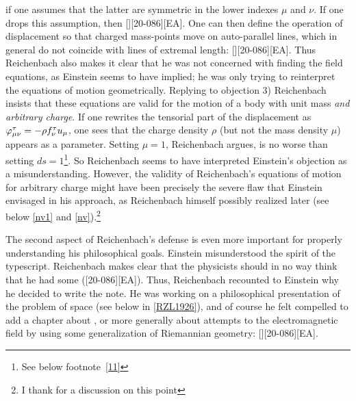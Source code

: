\documentclass[draft]{article}
\begin{document}
if one assumes that the latter are symmetric in the lower indexes $\mu$ and $\nu$. If one drops this assumption, then [][20-086][EA]. One can then define the operation of displacement so that charged mass-points move on auto-parallel lines, which in general do not coincide with lines of extremal length: [][20-086][EA]. Thus Reichenbach also makes it clear that he was not concerned with finding the field equations, as Einstein seems to have implied; he was only trying to reinterpret the equations of motion geometrically. Replying to objection 3) Reichenbach insists that these equations are valid for the motion of a body with unit mass \emph{and arbitrary charge}. If one rewrites the tensorial part of the displacement as $\varphi^\tau_{\mu\nu}=-\rho f^\tau_\nu u_\mu$, one sees that the charge density $\rho$ (but not the mass density $\mu$) appears as a parameter. Setting $\mu=1$, Reichenbach argues, is no worse than setting $d s=1$\footnote{See below footnote~\ref{11}}. So Reichenbach seems to have interpreted Einstein's objection as a misunderstanding. However, the validity of Reichenbach's equations of motion for arbitrary charge might have been precisely the severe flaw that Einstein envisaged in his approach, as Reichenbach himself possibly realized later (see below \cref{nv1} and \cref{nv}).\footnote{I thank  for a discussion on this point}

The second aspect of Reichenbach's defense is even more important for properly understanding his philosophical goals. Einstein misunderstood the spirit of the typescript. Reichenbach makes clear that the physicists should in no way think that he had some  ([20-086][EA]). Thus, Reichenbach recounted to Einstein why he decided to write the note. He was working on a philosophical presentation of the problem of space (see below in \cref{RZL1926}), and of course he felt compelled to add a chapter about , or more generally about attempts to  the electromagnetic field by using some generalization of Riemannian geometry: [][20-086][EA]. 
\end{document}
